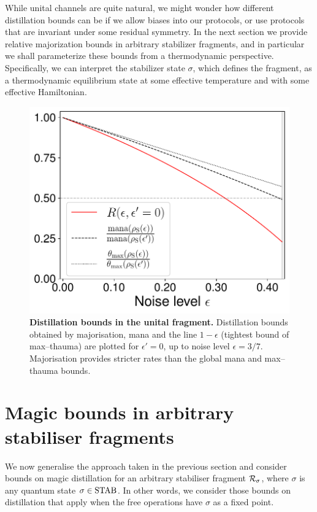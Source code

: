 \documentclass[pra,
aps,
twocolumn,
superscriptaddress,
groupedaddress,
nofootinbib,
reprint
]{revtex4-1}
\begin{document}
While unital channels are quite natural, we might wonder how different distillation bounds can be if we allow biases into our protocols, or use protocols that are invariant under some residual symmetry. In the next section we provide relative majorization bounds in arbitrary stabilizer fragments, and in particular we shall parameterize these bounds from a thermodynamic perspective. Specifically, we can interpret the stabilizer state $\sigma$, which defines the fragment, as a thermodynamic equilibrium state at some effective temperature and with some effective Hamiltonian.
\begin{figure}[t]
    \centering
    \includegraphics[scale=0.45]{figs/distill_bounds.pdf}
    \caption{\textbf{Distillation bounds in the unital fragment.} Distillation bounds obtained by majorisation, mana and the line $1-\epsilon$ (tightest bound of max--thauma) are plotted for $\epsilon' = 0$, up to noise level $\epsilon = 3/7$.
    Majorisation provides stricter rates than the global mana and max--thauma bounds.
    }
    \label{fig:distill_bounds}
\end{figure}

\section{Magic bounds in arbitrary stabiliser fragments}
\label{sec:stab}

We now generalise the approach taken in the previous section and consider bounds on magic distillation for an arbitrary stabiliser fragment $\mathcal{R}_\sigma$, where $\sigma$ is any quantum state $\sigma \in {\rm{STAB}}$.
In other words, we consider those bounds on distillation that apply when the free operations have $\sigma$ as a fixed point.
\end{document}
